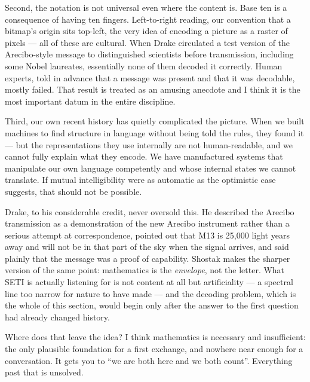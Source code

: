 Second, the notation is not universal even where the content is. Base ten is a consequence of having
ten fingers. Left-to-right reading, our convention that a bitmap's origin sits top-left, the very
idea of encoding a picture as a raster of pixels --- all of these are cultural. When Drake circulated
a test version of the Arecibo-style message to distinguished scientists before transmission, including
some Nobel laureates, essentially none of them decoded it correctly. Human experts, told in advance
that a message was present and that it was decodable, mostly failed. That result is treated as an
amusing anecdote and I think it is the most important datum in the entire discipline.

Third, our own recent history has quietly complicated the picture. When we built machines to find
structure in language without being told the rules, they found it --- but the representations they use
internally are not human-readable, and we cannot fully explain what they encode. We have manufactured
systems that manipulate our own language competently and whose internal states we cannot translate.
If mutual intelligibility were as automatic as the optimistic case suggests, that should not be
possible.


Drake, to his considerable credit, never oversold this. He described the Arecibo transmission as a
demonstration of the new Arecibo instrument rather than a serious attempt at correspondence, pointed
out that M13 is 25,000 light years away and will not be in that part of the sky when the signal
arrives, and said plainly that the message was a proof of capability. Shostak makes the sharper version
of the same point: mathematics is the \emph{envelope}, not the letter. What SETI is actually listening
for is not content at all but artificiality --- a spectral line too narrow for nature to have made ---
and the decoding problem, which is the whole of this section, would begin only after the answer to the
first question had already changed history.

Where does that leave the idea? I think mathematics is necessary and insufficient: the only plausible
foundation for a first exchange, and nowhere near enough for a conversation. It gets you to ``we are
both here and we both count''. Everything past that is unsolved.

